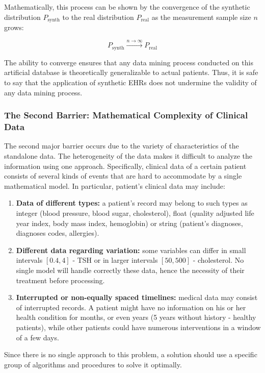 Mathematically, this process can be shown by the convergence of the synthetic distribution $P_{\text{synth}}$ to the real distribution $P_{\text{real}}$ as the measurement sample size $n$ grows:

\begin{equation}
    P_{\text{synth}} \xrightarrow{n \to \infty} P_{\text{real}}
\end{equation}

The ability to converge ensures that any data mining process conducted on this artificial database is theoretically generalizable to actual patients. Thus, it is safe to say that the application of synthetic EHRs does not undermine the validity of any data mining process.

\subsubsection*{The Second Barrier: Mathematical Complexity of Clinical Data}

The second major barrier occurs due to the variety of characteristics of the standalone data. The heterogeneity of the data makes it difficult to analyze the information using one approach. Specifically, clinical data of a certain patient consists of several kinds of events that are hard to accommodate by a single mathematical model. In particular, patient's clinical data may include:
\vspace{0.2em}
\begin{enumerate}
    \item \textbf{Data of different types:} a patient's record may belong to such types as integer (blood pressure, blood sugar, cholesterol), float (quality adjusted life year index, body mass index, hemoglobin) or string (patient's diagnoses, diagnoses codes, allergies).

    \item \textbf{Different data regarding variation:} some variables can differ in small intervals $[0.4, 4]$ - TSH or in larger intervals $[50, 500]$ - cholesterol. No single model will handle correctly these data, hence the necessity of their treatment before processing.

    \item \textbf{Interrupted or non-equally spaced timelines:} medical data may consist of interrupted records. A patient might have no information on his or her health condition for months, or even years (5 years without history - healthy patients), while other patients could have numerous interventions in a window of a few days.
\end{enumerate}
\vspace{1em}
Since there is no single approach to this problem, a solution should use a specific group  of algorithms and procedures to solve it optimally.

